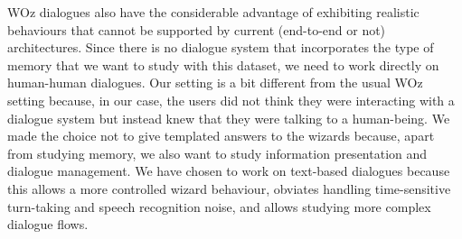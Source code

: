 \documentclass{article}
\theoremstyle{definition}
\begin{document}
WOz dialogues also have the considerable advantage of exhibiting realistic behaviours that cannot be supported by current (end-to-end or not) architectures. Since there is no dialogue system that incorporates the type of memory that we want to study with this dataset, we need to work directly on human-human dialogues. Our setting is a bit different from the usual WOz setting because, in our case, the users did not think they were interacting with a dialogue system but instead knew that they were talking to a human-being. We made the choice not to give templated answers to the wizards because, apart from studying memory, we also want to study information presentation and dialogue management. We have chosen to work on text-based dialogues because this allows a more controlled wizard behaviour, obviates handling time-sensitive turn-taking and speech recognition noise, and allows studying more complex dialogue flows.
\end{document}
